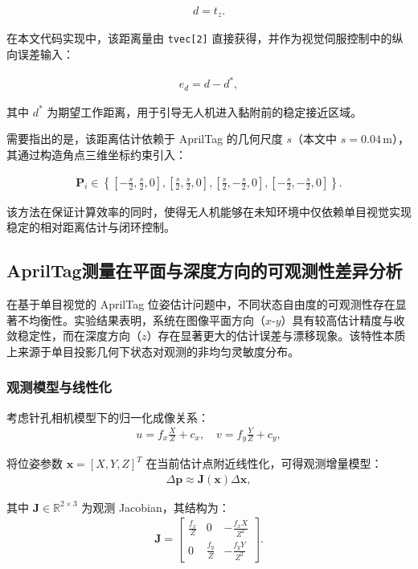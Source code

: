 \begin{align}
d = t_z.
\end{align}

在本文代码实现中，该距离量由 \texttt{tvec[2]} 直接获得，并作为视觉伺服控制中的纵向误差输入：

\begin{align}
e_d = d - d^\ast,
\end{align}

其中 $d^\ast$ 为期望工作距离，用于引导无人机进入黏附前的稳定接近区域。

需要指出的是，该距离估计依赖于 AprilTag 的几何尺度 $s$（本文中 $s = 0.04\,\mathrm{m}$），其通过构造角点三维坐标约束引入：

\begin{align}
\mathbf{P}_i \in \left\{
\left[-\frac{s}{2}, \frac{s}{2}, 0\right],
\left[\frac{s}{2}, \frac{s}{2}, 0\right],
\left[\frac{s}{2}, -\frac{s}{2}, 0\right],
\left[-\frac{s}{2}, -\frac{s}{2}, 0\right]
\right\}.
\end{align}

该方法在保证计算效率的同时，使得无人机能够在未知环境中仅依赖单目视觉实现稳定的相对距离估计与闭环控制。

\subsection{AprilTag测量在平面与深度方向的可观测性差异分析}

在基于单目视觉的 AprilTag 位姿估计问题中，不同状态自由度的可观测性存在显著不均衡性。实验结果表明，系统在图像平面方向（$x$-$y$）具有较高估计精度与收敛稳定性，而在深度方向（$z$）存在显著更大的估计误差与漂移现象。该特性本质上来源于单目投影几何下状态对观测的非均匀灵敏度分布。

\subsubsection{观测模型与线性化}

考虑针孔相机模型下的归一化成像关系：
\begin{align}
u = f_x \frac{X}{Z} + c_x, \quad v = f_y \frac{Y}{Z} + c_y,
\end{align}

将位姿参数 $\mathbf{x} = [X, Y, Z]^T$ 在当前估计点附近线性化，可得观测增量模型：
\begin{align}
\Delta \mathbf{p} \approx \mathbf{J}(\mathbf{x}) \Delta \mathbf{x},
\end{align}

其中 $\mathbf{J} \in \mathbb{R}^{2 \times 3}$ 为观测 Jacobian，其结构为：
\begin{align}
\mathbf{J} =
\begin{bmatrix}
\frac{f_x}{Z} & 0 & -\frac{f_x X}{Z^2} \\
0 & \frac{f_y}{Z} & -\frac{f_y Y}{Z^2}
\end{bmatrix}.
\end{align}

